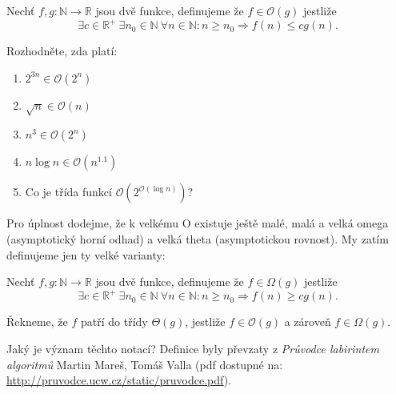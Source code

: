 Nechť $f, g \colon \mathbb{N} \rightarrow \mathbb{R}$ jsou dvě funkce, definujeme že $f \in \mathcal{O}(g)$ jestliže
$$\exists c \in \mathbb{R}^+ \  \exists n_0 \in \mathbb{N} \  \forall n \in \mathbb{N} \colon n \geq n_0 \Rightarrow f(n) \leq cg(n).$$

Rozhodněte, zda platí:
\begin{enumerate}
	\item  $2^{3n} \in \mathcal{O}(2^n)$
	\item  $\sqrt{n} \in  \mathcal{O}(n)$
	\item  $n^3 \in  \mathcal{O}(2^n)$
	\item  $n \log n \in  \mathcal{O}(n^{1.1})$
	\item  Co je třída funkcí $\mathcal{O}\left( 2^{\mathcal{O}(\log n)} \right)$?
\end{enumerate}

Pro úplnost dodejme, že k velkému O existuje ještě malé, malá a velká omega (asymptotický horní odhad) a velká theta (asymptotickou rovnost).
My zatím definujeme jen ty velké varianty:

Nechť $f, g \colon \mathbb{N} \rightarrow \mathbb{R}$ jsou dvě funkce, definujeme že $f \in \Omega(g)$ jestliže
$$\exists c \in \mathbb{R}^+ \  \exists n_0 \in \mathbb{N} \  \forall n \in \mathbb{N} \colon n \geq n_0 \Rightarrow f(n) \geq cg(n).$$

Řekneme, že $f$ patří do třídy $\Theta(g)$, jestliže $f \in \mathcal{O}(g)$ a zároveň $f \in \Omega(g)$.

Jaký je význam těchto notací?
Definice byly převzaty z \emph{Průvodce labirintem algoritmů} Martin Mareš, Tomáš Valla (pdf dostupné na: \url{http://pruvodce.ucw.cz/static/pruvodce.pdf}).

